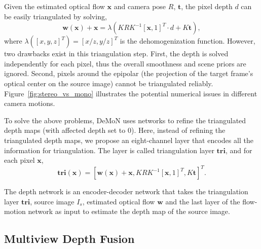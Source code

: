 \documentclass[letterpaper, 10 pt, conference]{ieeeconf}  %
\begin{document}
Given the estimated optical flow $\mathbf{x}$ and camera pose $R$, $\mathbf{t}$, the pixel depth $d$ can be easily triangulated by solving,
\begin{equation} \label{triangulate}
\mathbf{w}(\mathbf{x}) + \mathbf{x} = \lambda(KRK^{-1}[\mathbf{x}, 1]^T \cdot d + K\mathbf{t}),
\end{equation}
where $\lambda([x,y,z]^T) = [x/z,y/z]^T$ is the dehomogenization function. However, two drawbacks exist in this triangulation step. First, the depth is solved independently for each pixel, thus the overall smoothness and scene priors are ignored. Second, pixels around the epipolar (the projection of the target frame's optical center on the source image) cannot be triangulated reliably. Figure~\ref{fig:stereo_vs_mono} illustrates the potential numerical issues in different camera motions.
 
To solve the above problems, DeMoN uses networks to refine the triangulated depth maps (with affected depth set to 0). Here, instead of refining the triangulated depth maps, we propose an eight-channel layer that encodes all the information for triangulation. The layer is called triangulation layer $\mathbf{tri}$, and for each pixel $\mathbf{x}$,
\begin{equation}
\mathbf{tri}(\mathbf{x}) = [\mathbf{w}(\mathbf{x}) + \mathbf{x}, KRK^{-1}[\mathbf{x}, 1]^T, K\mathbf{t}]^T.
\end{equation}
 
The depth network is an encoder-decoder network that takes the triangulation layer $\mathbf{tri}$, source image $I_s$, estimated optical flow $\mathbf{w}$ and the last layer of the flow-motion network as input to estimate the depth map of the source image.
 
\subsection{Multiview Depth Fusion}\label{multiframe_sfm}
 
\end{document}

